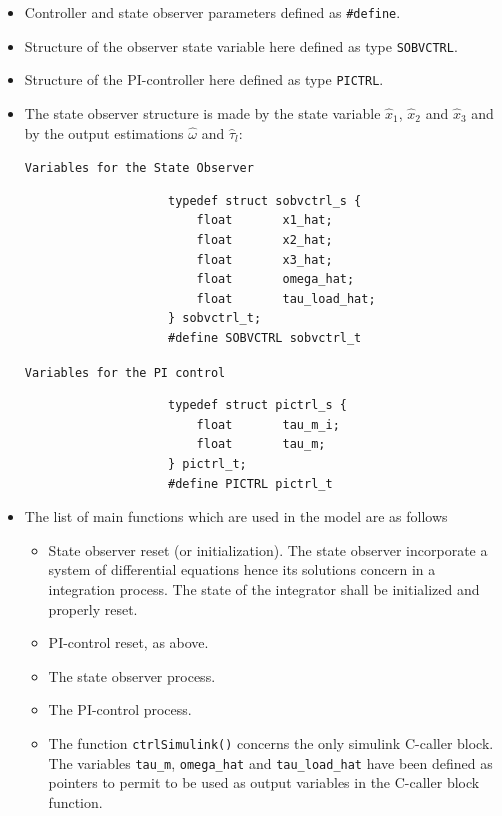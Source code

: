\documentclass[11pt,a4paper,oneside]{book}
\numberwithin{equation}{section}
\theoremstyle{it}
\theoremstyle{definition}
\begin{document}
	\begin{itemize}
		\item Controller and state observer parameters defined as {\selectfont \verb+#define+}.
		\item Structure of the observer state variable here defined as type {\selectfont \verb+SOBVCTRL+}.
		\item Structure of the PI-controller here defined as type {\selectfont \verb+PICTRL+}.
		\item The state observer structure is made by the state variable $\hat{x}_1$, $\hat{x}_2$ and $\hat{x}_3$ and by the output estimations $\hat{\omega}$ and $\hat{\tau}_l$:
		\begin{mybox}
					\begin{center}
							{\selectfont \verb+Variables for the State Observer+}
						\end{center}
			{\selectfont \footnotesize \noindent
				\begin{verbatim}
					typedef struct sobvctrl_s {
					    float		x1_hat;
					    float		x2_hat;
					    float		x3_hat;
					    float		omega_hat;
					    float		tau_load_hat;
					} sobvctrl_t;
					#define SOBVCTRL sobvctrl_t
			\end{verbatim}}
		\end{mybox}
		\begin{mybox}
					\begin{center}
							{\selectfont \verb+Variables for the PI control+}
						\end{center}
			{\selectfont \footnotesize \noindent
				\begin{verbatim}
					typedef struct pictrl_s {
					    float		tau_m_i;
					    float		tau_m;
					} pictrl_t;
					#define PICTRL pictrl_t
			\end{verbatim}}
		\end{mybox}
		
		\item The list of main functions which are used in the model are as follows
		\begin{itemize}
			\item State observer reset (or initialization). The state observer incorporate a system of differential equations hence its solutions concern in a integration process. The state of the integrator shall be initialized and properly reset. 
			\item PI-control reset, as above.
			\item The state observer process.
			\item The PI-control process. 
			\item The function \texttt{ctrlSimulink()} concerns the only simulink C-caller block. The variables \texttt{tau\_m}, \texttt{omega\_hat} and \texttt{tau\_load\_hat} have been defined as pointers to permit to be used as output variables in the C-caller block function.
		\end{itemize}   
	\end{itemize}
	
\end{document}
